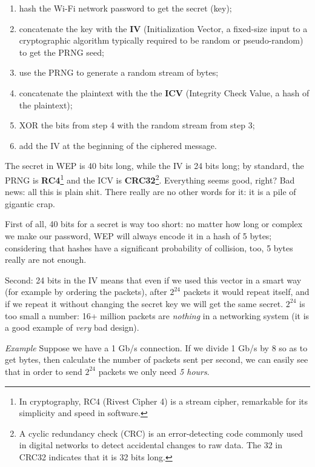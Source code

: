 \begin{enumerate}
    \item hash the Wi-Fi network password to get the secret (key);
    \item concatenate the key with the \textbf{IV} (Initialization Vector, a fixed-size input to a cryptographic algorithm typically required to be random or pseudo-random) to get the PRNG seed;
    \item use the PRNG to generate a random stream of bytes;
    \item concatenate the plaintext with the the \textbf{ICV} (Integrity Check Value, a hash of the plaintext);
    \item XOR the bits from step 4 with the random stream from step 3;
    \item add the IV at the beginning of the ciphered message.
\end{enumerate}

The secret in WEP is 40 bits long, while the IV is 24 bits long; by standard, the PRNG is \textbf{RC4}\footnote{In cryptography, RC4 (Rivest Cipher 4) is a stream cipher, remarkable for its simplicity and speed in software.} and the ICV is \textbf{CRC32}\footnote{A cyclic redundancy check (CRC) is an error-detecting code commonly used in digital networks to detect accidental changes to raw data. The 32 in CRC32 indicates that it is 32 bits long.}. Everything seems good, right? Bad news: all this is plain shit. There really are no other words for it: it is a pile of gigantic crap.

First of all, 40 bits for a secret is way too short: no matter how long or complex we make our password, WEP will always encode it in a hash of 5 bytes; considering that hashes have a significant probability of collision, too, 5 bytes really are not enough.

Second: 24 bits in the IV means that even if we used this vector in a smart way (for example by ordering the packets), after $2^{24}$ packets it would repeat itself, and if we repeat it without changing the secret key we will get the same secret. $2^{24}$ is too small a number: 16+ million packets are \textit{nothing} in a networking system (it is a good example of \textit{very} bad design).

\vspace{0.5em}

\emph{Example} Suppose we have a 1 Gb/s connection. If we divide 1 Gb/s by 8 so as to get bytes, then calculate the number of packets sent per second, we can easily see that in order to send $2^{24}$ packets we only need \textit{5 hours}.

